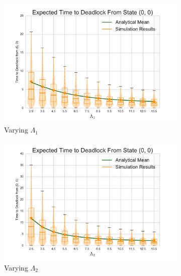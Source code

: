 \documentclass{article}
\begin{document}
\begin{figure}[!htbp]
\begin{center}
\begin{subfigure}[b]{0.35\textwidth}
  \includegraphics[width=\textwidth]{images/vary_L1fb}
  \caption{Varying $\Lambda_1$}
  \label{fig:timestodeadlockfb_L1}
\end{subfigure}
\begin{subfigure}[b]{0.35\textwidth}
  \includegraphics[width=\textwidth]{images/vary_L2fb}
  \caption{Varying $\Lambda_2$}
  \label{fig:timestodeadlockfb_L2}
\end{subfigure}\\
\begin{subfigure}[b]{0.35\textwidth}

\end{subfigure}
\end{center}
\end{figure}
\end{document}
